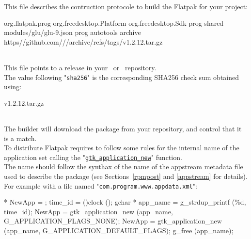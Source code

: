 This file describes the contruction protocole to build the Flatpak for your project:
{\footnotesize{
\begin{script}
 org.flatpak.prog
 org.freedesktop.Platform
 
 org.freedesktop.Sdk
 prog
  \bbtt{-} shared-modules/glu/glu-9.json
  \bbtt{-}  prog
     autotools
     
      \bbtt{-}  archive
         https//github.com///archive/refs/tags/v1.2.12.tar.gz
         
\end{script}
}}
\\[-0.5cm]
\noindent This file points to a release in your \github\ or \gitlab\ repository. \\
The value following "\texttt{sha256}" is the corresponding SHA256 check sum obtained using: 
\begin{script}
 v1.2.12.tar.gz
\end{script} \\[-0.5cm]
\noindent
The builder will download the package from your repository, and control that it is a match. 
\newpage
{}\\[0.25cm]
To distribute Flatpak requires to follow some rules for the internal name of the application set calling the "\href{https://docs.gtk.org/gtk4/ctor.Application.new.html}{\texttt{gtk\_application\_new}}" function. \\
The name should follow the synthax of the name of the appstream metadata file used to describe the package (see Sections~\ref{rpmpost} and \ref{appstream} for details). \\[0.25cm]
For example with a file named "\texttt{com.program.www.appdata.xml}":
\begin{script}
 * NewApp = ;
 time\_id = ()clock ();
gchar * app\_name = g\_strdup\_printf (\%d, time\_id);
 
  NewApp = gtk\_application\_new (app\_name, G\_APPLICATION\_FLAGS\_NONE);
  NewApp = gtk\_application\_new (app\_name, G\_APPLICATION\_DEFAULT\_FLAGS);
g\_free (app\_name);
\end{script}

